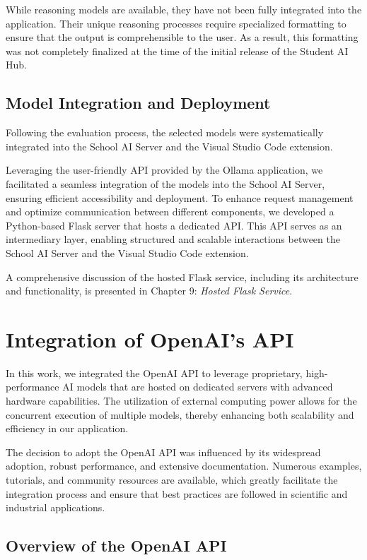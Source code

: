 While reasoning models are available, they have not been fully integrated into the application. Their unique reasoning processes require specialized formatting to ensure that the output is comprehensible to the user. As a result, this formatting was not completely finalized at the time of the initial release of the Student AI Hub.


\subsection{Model Integration and Deployment}

Following the evaluation process, the selected models were systematically integrated into the School AI Server and the Visual Studio Code extension. 

Leveraging the user-friendly API provided by the Ollama application, we facilitated a seamless integration of the models into the School AI Server, ensuring efficient accessibility and deployment. To enhance request management and optimize communication between different components, we developed a Python-based Flask server that hosts a dedicated API. This API serves as an intermediary layer, enabling structured and scalable interactions between the School AI Server and the Visual Studio Code extension.

A comprehensive discussion of the hosted Flask service, including its architecture and functionality, is presented in Chapter 9: \textit{Hosted Flask Service}.


\section{Integration of OpenAI's API}

In this work, we integrated the OpenAI API to leverage proprietary, 
high-performance AI models that are hosted on dedicated servers with advanced hardware capabilities. 
The utilization of external computing power allows for the concurrent execution of multiple models, 
thereby enhancing both scalability and efficiency in our application.

The decision to adopt the OpenAI API was influenced by its widespread adoption, 
robust performance, and extensive documentation. Numerous examples, tutorials, and community resources are available, 
which greatly facilitate the integration process and ensure that best practices are followed in scientific and industrial applications.

\subsection{Overview of the OpenAI API}

